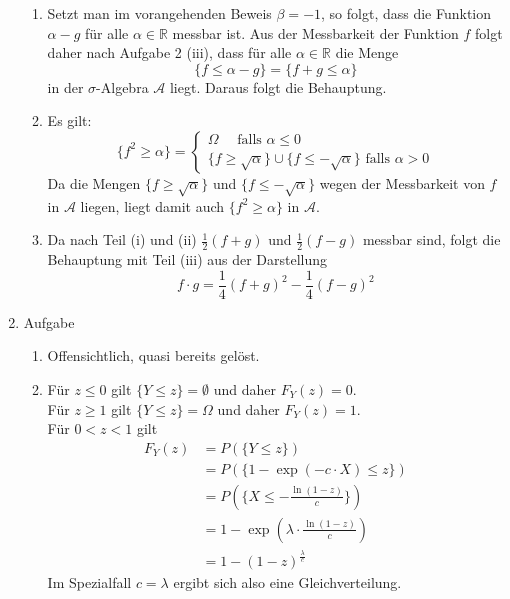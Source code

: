 \documentclass[12pt,a4paper]{article}
\begin{document}
\begin{enumerate}
\begin{enumerate}[label=(\roman*)]
\item Setzt man im vorangehenden Beweis $\beta = -1$, so folgt, dass die Funktion $\alpha - g$ für alle $\alpha \in \mathbb{R}$ messbar ist. Aus der Messbarkeit der Funktion $f$ folgt daher nach Aufgabe 2 (iii), dass für alle $\alpha \in \mathbb{R}$ die Menge \[
\{f \leq \alpha - g\} = \{f + g \leq \alpha\}
\]
in der $\sigma$-Algebra $\mathscr{A}$ liegt. Daraus folgt die Behauptung.

\item Es gilt: \[
\{f^2 \geq \alpha\}=\begin{cases} \Omega \quad \text{ falls } \alpha \leq 0\\
\{f \geq \sqrt{\alpha}\} \cup \{f \leq - \sqrt{\alpha}\} \text{ falls } \alpha > 0 \end{cases}
\]
Da die Mengen $\{f \geq \sqrt{\alpha}\}$ und $\{f \leq - \sqrt{\alpha}\}$ wegen der Messbarkeit von $f$ in $\mathscr{A}$ liegen, liegt damit auch $\{f^2 \geq \alpha\}$ in $\mathscr{A}$.

\item Da nach Teil (i) und (ii)  $\frac{1}{2}(f + g)$ und $\frac{1}{2}(f - g)$ messbar sind, folgt die Behauptung mit Teil (iii) aus der Darstellung \[
f \cdot g = \frac{1}{4}(f + g)^2 - \frac{1}{4}(f - g)^2
\]

\end{enumerate}

\item Aufgabe 

\begin{enumerate}[label=(\roman*)]

\item Offensichtlich, quasi bereits gelöst.

\item Für $z \leq 0$ gilt $\{ Y \leq z\} = \emptyset$ und daher $F_Y (z) = 0$. \\ Für $z \geq 1$ gilt $\{ Y \leq z\} = \Omega$ und daher $F_Y (z) = 1$. \\ Für $0 < z <1$ gilt 
\begin{align*} 
F_Y (z) &= P(\{ Y \leq z\})  \\ 
&=  P(\{ 1 - \exp (-c \cdot X) \leq z\}) \\
&= P(\{ X \leq -\frac{\ln (1 - z)}{c}\}) \\
&= 1- \exp (\lambda \cdot \frac{\ln (1 - z)}{c}) \\
&= 1 - (1 - z)^{\frac{\lambda}{c}}
\end{align*}
Im Spezialfall $c = \lambda$ ergibt sich also eine Gleichverteilung.


\end{enumerate}
\end{enumerate}
\end{document}
